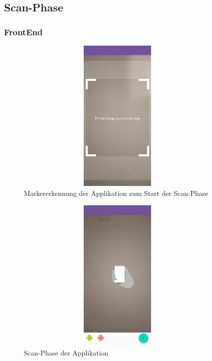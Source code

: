 \subsection{Scan-Phase} %
\subsubsection{FrontEnd}
\begin{figure}[hbt!]
    \centering
    \includegraphics[width=10cm,height=7.5cm,keepaspectratio]{4Umsetzung/Bilder/image_tracking.jpg}
    \caption{Markererkennung der Applikation zum Start der Scan-Phase}
    \label{pic:image_tracking}
\end{figure}
\begin{figure}[hbt!]
    \centering
    \includegraphics[width=10cm,height=7.5cm,keepaspectratio]{4Umsetzung/Bilder/scan-phase.jpg}
    \caption{Scan-Phase der Applikation}
    \label{pic:scan}
\end{figure}
